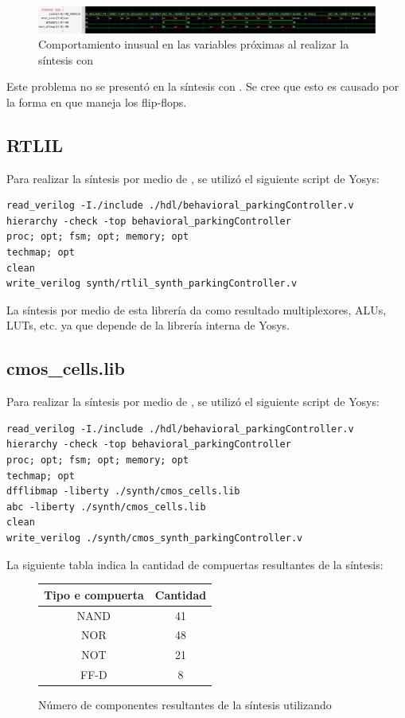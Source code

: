 \begin{figure}[!h]
    \centering
    \includegraphics[width = \linewidth]{figs/inusual.png}
    \caption{Comportamiento inusual en las variables próximas al realizar la síntesis con }
    \label{inusual}
\end{figure}


Este problema no se presentó en la síntesis con . 
Se cree que esto es causado por la forma en que  maneja los flip-flops. 

\newpage 

\subsection{RTLIL}
Para realizar la síntesis por medio de , se utilizó el siguiente script de Yosys:

\begin{verbatim}
read_verilog -I./include ./hdl/behavioral_parkingController.v
hierarchy -check -top behavioral_parkingController
proc; opt; fsm; opt; memory; opt
techmap; opt
clean
write_verilog synth/rtlil_synth_parkingController.v
\end{verbatim}

La síntesis por medio de esta librería da como resultado multiplexores, ALUs, LUTs, etc. ya que depende de la librería interna de Yosys.

\subsection{cmos\_cells.lib}
Para realizar la síntesis por medio de , se utilizó el siguiente script de Yosys:

\begin{verbatim}
read_verilog -I./include ./hdl/behavioral_parkingController.v
hierarchy -check -top behavioral_parkingController
proc; opt; fsm; opt; memory; opt
techmap; opt
dfflibmap -liberty ./synth/cmos_cells.lib
abc -liberty ./synth/cmos_cells.lib
clean
write_verilog ./synth/cmos_synth_parkingController.v
\end{verbatim}
La siguiente tabla indica la cantidad de compuertas resultantes de la síntesis:

\begin{figure}[!h]
    \centering
    \begin{tabular}{cc}
        \toprule
        \textbf{Tipo e compuerta} & \textbf{Cantidad} \\
        \midrule
        NAND    & 41 \\
        NOR     & 48 \\
        NOT     & 21 \\
        FF-D    & 8 \\
        \bottomrule
    \end{tabular}
    \caption{Número de componentes resultantes de la síntesis utilizando }
\end{figure}
